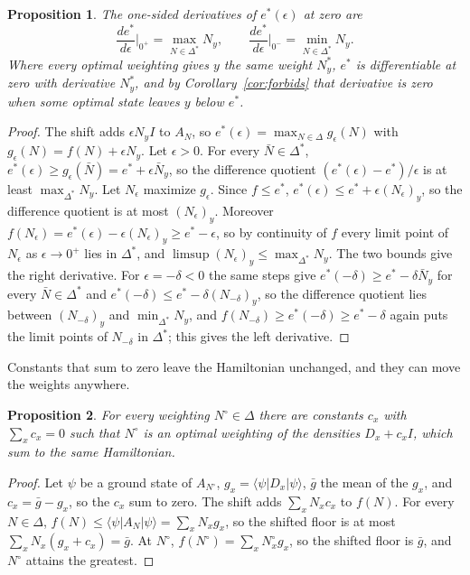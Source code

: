 \documentclass[aps,prd,reprint,superscriptaddress]{revtex4-2}
\newtheorem{proposition}{Proposition}
\begin{document}
\begin{proposition}\label{prop:rates}
The one-sided derivatives of $e^*(\epsilon)$ at zero are
\begin{equation}
\frac{de^*}{d\epsilon}\Big|_{0^+} = \max_{N\in\Delta^*} N_y, \qquad \frac{de^*}{d\epsilon}\Big|_{0^-} = \min_{N\in\Delta^*} N_y .
\label{eq:rates}
\end{equation}
Where every optimal weighting gives $y$ the same weight $N^*_y$, $e^*$ is differentiable at zero with derivative $N^*_y$, and by Corollary~\ref{cor:forbids} that derivative is zero when some optimal state leaves $y$ below $e^*$.
\end{proposition}
\begin{proof}
The shift adds $\epsilon N_y I$ to $A_N$, so $e^*(\epsilon) = \max_{N\in\Delta} g_\epsilon(N)$ with $g_\epsilon(N) = f(N) + \epsilon N_y$. Let $\epsilon > 0$. For every $\bar N \in \Delta^*$, $e^*(\epsilon) \ge g_\epsilon(\bar N) = e^* + \epsilon\bar N_y$, so the difference quotient $(e^*(\epsilon) - e^*)/\epsilon$ is at least $\max_{\Delta^*} N_y$. Let $N_\epsilon$ maximize $g_\epsilon$. Since $f \le e^*$, $e^*(\epsilon) \le e^* + \epsilon (N_\epsilon)_y$, so the difference quotient is at most $(N_\epsilon)_y$. Moreover $f(N_\epsilon) = e^*(\epsilon) - \epsilon (N_\epsilon)_y \ge e^* - \epsilon$, so by continuity of $f$ every limit point of $N_\epsilon$ as $\epsilon \to 0^+$ lies in $\Delta^*$, and $\limsup (N_\epsilon)_y \le \max_{\Delta^*} N_y$. The two bounds give the right derivative. For $\epsilon = -\delta < 0$ the same steps give $e^*(-\delta) \ge e^* - \delta\bar N_y$ for every $\bar N \in \Delta^*$ and $e^*(-\delta) \le e^* - \delta (N_{-\delta})_y$, so the difference quotient lies between $(N_{-\delta})_y$ and $\min_{\Delta^*} N_y$, and $f(N_{-\delta}) \ge e^*(-\delta) \ge e^* - \delta$ again puts the limit points of $N_{-\delta}$ in $\Delta^*$; this gives the left derivative.
\end{proof}

Constants that sum to zero leave the Hamiltonian unchanged, and they can move the weights anywhere.

\begin{proposition}\label{prop:division}
For every weighting $N^\circ \in \Delta$ there are constants $c_x$ with $\sum_x c_x = 0$ such that $N^\circ$ is an optimal weighting of the densities $D_x + c_x I$, which sum to the same Hamiltonian.
\end{proposition}
\begin{proof}
Let $\psi$ be a ground state of $A_{N^\circ}$, $g_x = \langle\psi|D_x|\psi\rangle$, $\bar g$ the mean of the $g_x$, and $c_x = \bar g - g_x$, so the $c_x$ sum to zero. The shift adds $\sum_x N_x c_x$ to $f(N)$. For every $N \in \Delta$, $f(N) \le \langle\psi|A_N|\psi\rangle = \sum_x N_x g_x$, so the shifted floor is at most $\sum_x N_x (g_x + c_x) = \bar g$. At $N^\circ$, $f(N^\circ) = \sum_x N^\circ_x g_x$, so the shifted floor is $\bar g$, and $N^\circ$ attains the greatest.
\end{proof}
\end{document}
